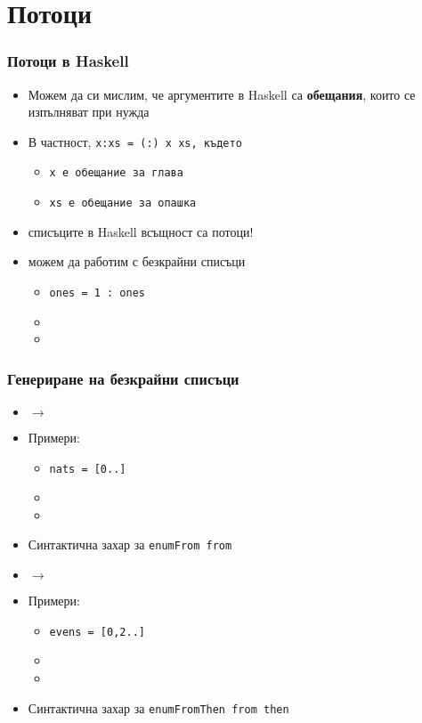 \documentclass{beamer}
\begin{document}
\section{Потоци}

\begin{frame}
  \frametitle{Потоци в Haskell}

  \begin{itemize}[<+->]
  \item Можем да си мислим, че аргументите в Haskell са \textbf{обещания}, които се изпълняват при нужда
  \item В частност, \tt{x:xs = (:) x xs}, където
    \begin{itemize}
    \item \tt x е обещание за глава
    \item \tt{xs} е обещание за опашка
    \end{itemize}
  \item \alert{списъците в Haskell всъщност са потоци!}
  \item можем да работим с безкрайни списъци
    \begin{itemize}
    \item \tt{ones = 1 : ones}
    \item {}
    \item {}
    \end{itemize}
  \end{itemize}
\end{frame}

\begin{frame}
  \frametitle{Генериране на безкрайни списъци}

  \begin{itemize}
  \item {} $\rightarrow$ 
  \item Примери:
    \begin{itemize}
    \item \tt{nats = [0..]}
    \item {}
    \item {}
    \end{itemize}
  \item Синтактична захар за \tt{enumFrom from}
    \pause
  \item {} $\rightarrow$ 
  \item Примери:
    \begin{itemize}
    \item \tt{evens = [0,2..]}
    \item {}
    \item {}
    \end{itemize}
  \item Синтактична захар за \tt{enumFromThen from then}
  \end{itemize}
\end{frame}
\end{document}
